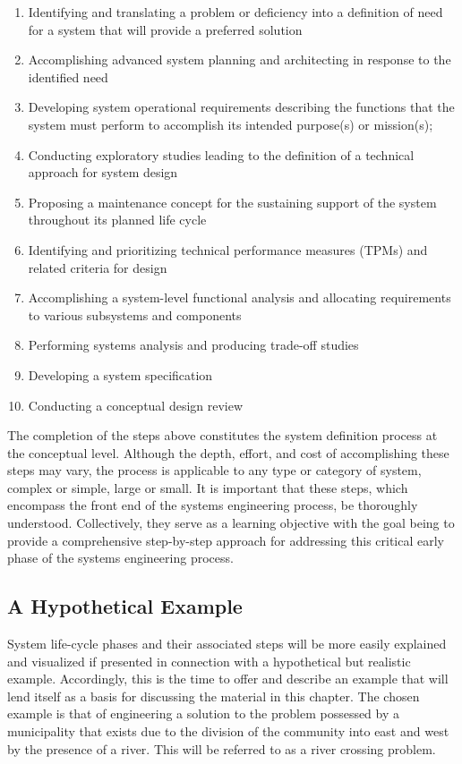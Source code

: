 \begin{enumerate}
\item Identifying and translating a problem or deficiency into a definition of need for a system that will provide a preferred solution
\item Accomplishing advanced system planning and architecting in response to the identified need
\item Developing system operational requirements describing the functions that the system must perform to accomplish its intended purpose(s) or mission(s);
\item Conducting exploratory studies leading to the definition of a technical approach for system design
\item Proposing a maintenance concept for the sustaining support of the system throughout its planned life cycle
\item Identifying and prioritizing technical performance measures (TPMs) and related criteria for design
\item Accomplishing a system-level functional analysis and allocating requirements to various subsystems and components
\item Performing systems analysis and producing trade-off studies
\item Developing a system specification
\item Conducting a conceptual design review
\end{enumerate}

The completion of the steps above constitutes the system definition process at the conceptual level. Although the depth, effort, and cost of accomplishing these steps may vary, the process is applicable to any type or category of system, complex or simple, large or small. It is important that these steps, which encompass the front end of the systems engineering process, be thoroughly understood. Collectively, they serve as a learning objective with the goal being to provide a comprehensive step-by-step approach for addressing this critical early phase of the systems engineering process.
    
\subsection{A Hypothetical Example}

System life-cycle phases and their associated steps will be more easily explained and visualized if presented in connection with a hypothetical but realistic example. Accordingly, this is the time to offer and describe an example that will lend itself as a basis for discussing the material in this chapter. The chosen example is that of engineering a solution to the problem possessed by a municipality that exists due to the division of the community into east and west by the presence of a river. This will be referred to as a river crossing problem.

